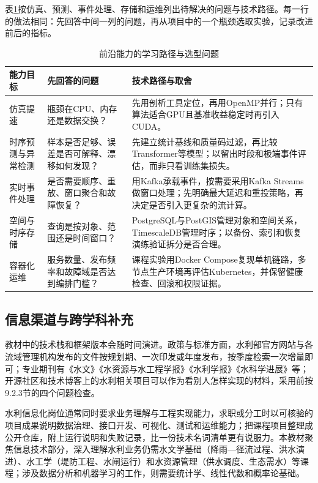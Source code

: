 表\ref{tab:ch09-technology-paths}按仿真、预测、事件处理、存储和运维列出待解决的问题与技术路径。每一行的做法相同：先回答中间一列的问题，再从项目中的一个瓶颈选取实验，记录改进前后的指标。

\begin{table}[htbp]
\centering
\caption{前沿能力的学习路径与选型问题}
\label{tab:ch09-technology-paths}
\begin{tabular}{p{3.0cm}p{4.2cm}p{5.4cm}}
\toprule
能力目标 & 先回答的问题 & 技术路径与取舍 \\
\midrule
仿真提速 & 瓶颈在CPU、内存还是数据交换？ & 先用剖析工具定位，再用OpenMP并行；只有算法适合GPU且基准收益稳定时再引入CUDA。 \\
时序预测与异常检测 & 样本是否足够、误差是否可解释、漂移如何发现？ & 先建立统计基线和质量码过滤，再比较Transformer等模型；以留出时段和极端事件评估，而非只看训练集损失。 \\
实时事件处理 & 是否需要顺序、重放、窗口聚合和故障恢复？ & 用Kafka承载事件，按需要采用Kafka Streams做窗口处理；先明确最大延迟和重投策略，再决定是否引入更复杂的流计算。 \\
空间与时序存储 & 查询是按对象、范围还是时间窗口？ & PostgreSQL与PostGIS管理对象和空间关系，TimescaleDB管理时序；以备份、索引和恢复演练验证拆分是否合理。 \\
容器化运维 & 服务数量、发布频率和故障域是否达到编排门槛？ & 课程实验用Docker Compose复现单机链路，多节点生产环境再评估Kubernetes，并保留健康检查、回滚和权限证据。 \\
\bottomrule
\end{tabular}
\end{table}

\subsection{信息渠道与跨学科补充}

教材中的技术栈和框架版本会随时间演进。政策与标准方面，水利部官方网站与各流域管理机构发布的文件按规划期、一次印发或年度发布，按季度检索一次增量即可；专业期刊有《水文》《水资源与水工程学报》《水利学报》《水科学进展》等；开源社区和技术博客上的水利相关项目可以作为看别人怎样实现的材料，采用前按9.2.3节的四个问题检查。

水利信息化岗位通常同时要求业务理解与工程实现能力，求职或分工时以可核验的项目成果说明数据治理、接口开发、可视化、测试和运维能力；把课程项目整理成公开仓库，附上运行说明和失败记录，比一份技术名词清单更有说服力。本教材聚焦信息技术部分，深入理解水利业务仍需水文学基础（降雨—径流过程、洪水演进）、水工学（堤防工程、水闸运行）和水资源管理（供水调度、生态需水）等课程；涉及数据分析和机器学习的工作，则需要统计学、线性代数和概率论基础。

